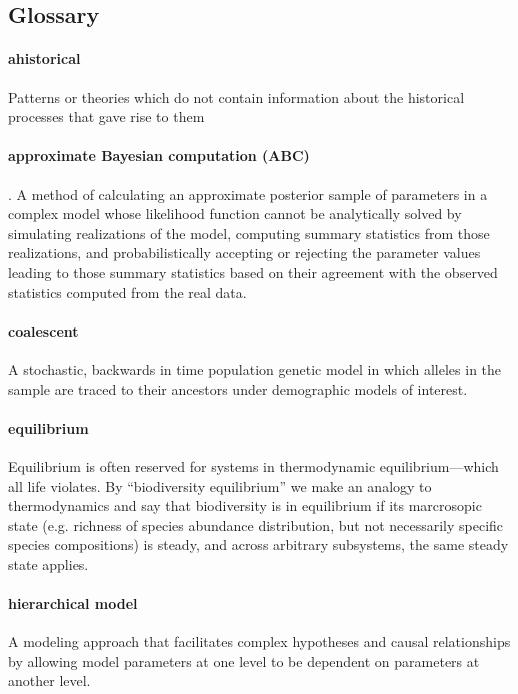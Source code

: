 \documentclass[12pt]{article}
\begin{document}
\subsection*{Glossary}

\paragraph{ahistorical} Patterns or theories which do not contain
information about the historical processes that gave rise to them

\paragraph{approximate Bayesian computation (ABC)}. A method of
calculating an approximate posterior sample of parameters in a complex model
whose likelihood function cannot be analytically solved by simulating
realizations of the model, computing summary statistics from those
realizations, and probabilistically accepting or rejecting the
parameter values leading to those summary statistics based on their
agreement with the observed statistics computed from the real data.

\paragraph{coalescent} A stochastic, backwards in time population
genetic model in which alleles in the sample are traced to their
ancestors under demographic models of interest.

\paragraph{equilibrium} Equilibrium is often reserved for systems in
thermodynamic equilibrium---which all life violates.  By
``biodiversity equilibrium'' we make an analogy to thermodynamics and
say that biodiversity is in equilibrium if its marcrosopic state
(e.g. richness of species abundance distribution, but not necessarily
specific species compositions) is steady, and across arbitrary
subsystems, the same steady state applies.

\paragraph{hierarchical model} A modeling approach that facilitates
complex hypotheses and causal relationships by allowing model
parameters at one level to be dependent on parameters at another
level.
\end{document}
